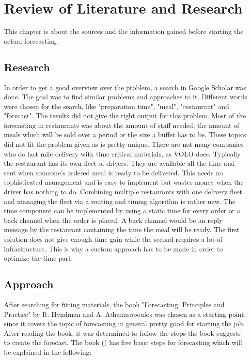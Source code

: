 \renewcommand{\thepage}{\arabic{page}}
\chapter{Review of Literature and Research}\label{chapter:Review of Literature and Research}
This chapter is about the sources and the information gained before starting the actual forecasting.
\section{Research}\label{section:Research}
In order to get a good overview over the problem, a search in Google Scholar was done. The goal was to find similar problems and approaches to it. Different words were chosen for the search, like "preparation time", "meal", "restaurant" and "forecast". The results did not give the right output for this problem. Most of the forecasting in restaurants was about the amount of staff needed, the amount of meals which will be sold over a period or the size a buffet has to
be. These topics did not fit the problem given as is pretty unique. There are not many companies who do last mile delivery with time critical materials, as VOLO does. Typically the restaurant has its own fleet of drivers. They are available all the time and sent when someone's ordered meal is ready to be delivered. This needs no sophisticated management  and is easy to implement but wastes money when the driver has nothing to do. Combining multiple restaurants with one delivery fleet and managing the fleet via a routing and timing algorithm is rather new. The time component can be implemented by using a static time for every order or a back channel when the order is placed. A back channel would be an reply message by the restaurant containing the time the meal will be ready. The first solution does not give enough time gain while the second requires a lot of infrastructure. This is why a custom approach has to be made in order to optimize the time part.
\section{Approach}\label{section:Approach and Basics}
After searching for fitting materials, the book "Forecasting: Principles and Practice" by R. Hyndman and A. Athanasopoulos was chosen as a starting point, since it covers the topic of forecasting in general pretty good for starting the job. After reading the book, it was determined to follow the steps the book suggests to create the forecast. The book (\cite{Hyndman.2013}) has five basic steps for forecasting which will be explained in the following:

